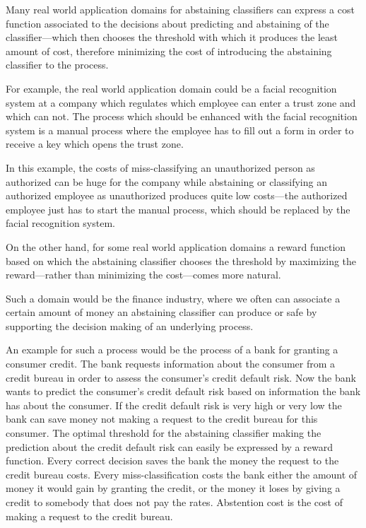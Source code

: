 \documentclass[twoside,11pt]{article}
\begin{document}
Many real world application domains for abstaining
classifiers can express a cost function associated to the
decisions about predicting and abstaining of the
classifier---which then chooses the threshold with which it
produces the least amount of cost, therefore minimizing
the cost of introducing the abstaining classifier to the
process.

For example, the real world application domain could be a
facial recognition system at a company which regulates
which employee can enter a trust zone and which can not.
The process which should be enhanced with the facial
recognition system is a manual process where the employee
has to fill out a form in order to receive a key which
opens the trust zone.

In this example, the costs of miss-classifying an
unauthorized person as authorized can be huge for
the company while abstaining or classifying an authorized
employee as unauthorized produces quite low costs---the
authorized employee just has to start the manual process,
which should be replaced by the facial recognition system.

On the other hand, for some real world application domains
a reward function based on which the abstaining classifier
chooses the threshold by maximizing the reward---rather
than minimizing the cost---comes more natural.

Such a domain would be the finance industry,
where we often can associate a certain amount of money an
abstaining classifier can produce or safe by supporting the
decision making of an underlying process.

An example for such a process would be the process of a
bank for granting a consumer credit.
The bank requests information about the consumer from a
credit bureau in order to assess the consumer's credit
default risk.
Now the bank wants to predict the consumer's credit
default risk based on information the bank has about the
consumer.
If the credit default risk is very high or very low the
bank can save money not making a request to the credit
bureau for this consumer.
The optimal threshold for the abstaining classifier making
the prediction about the credit default risk can easily be
expressed by a reward function.
Every correct decision saves the bank the money the request
to the credit bureau costs.
Every miss-classification costs the bank either the amount
of money it would gain by granting the credit, or the
money it loses by giving a credit to somebody that does not
pay the rates.
Abstention cost is the cost of making a request to the
credit bureau.
\end{document}
